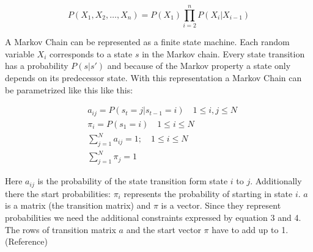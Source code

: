 \begin{equation}
P\left(X_{1}, X_{2}, \ldots, X_{n}\right)=P\left(X_{1}\right) \prod_{i=2}^{n} P\left(X_{i} | X_{i-1}\right)
\end{equation}

A Markov Chain can be represented as a finite state machine. Each random variable $X_i$ corresponds to a state $s$ in the Markov chain. Every state transition has a probability $P(s | s')$ and because of the Markov property a state only depends on its predecessor state. With this representation a Markov Chain can be parametrized like this like this:

\begin{equation}
\begin{aligned}
&a_{i j}=P\left(s_{t}=j | s_{t-1}=i\right) \quad 1 \leq i, j \leq N \\
&\pi_{i}=P\left(s_{1}=i\right) \quad 1 \leq i \leq N \\
&\sum_{j=1}^{N} a_{i j}=1 ; \quad 1 \leq i \leq N \\
&\sum_{j=1}^{N} \pi_{j}=1
\end{aligned}
\end{equation}

Here $a_{ij}$ is the probability of the state transition form state $i$ to $j$. Additionally there the start probabilities: $\pi_i$ represents the probability of starting in state $i$. $a$ is a matrix (the transition matrix) and $\pi$ is a vector. Since they represent probabilities we need the additional constraints expressed by equation 3 and 4. The rows of transition matrix $a$ and the start vector $\pi$ have to add up to 1.  (Reference)

